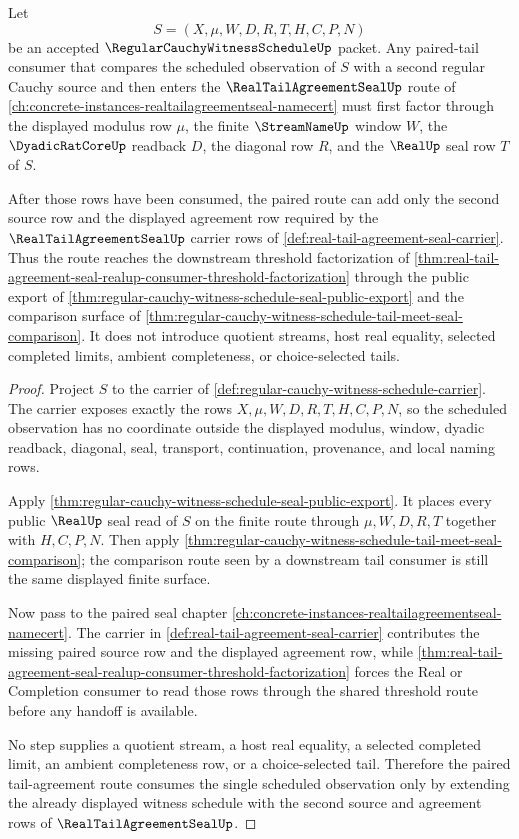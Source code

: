 \begin{theorem}
\label{thm:regular-cauchy-witness-schedule-tail-agreement-consumer}
Let
$$
S=(X,\mu,W,D,R,T,H,C,P,N)
$$
be an accepted $\RegularCauchyWitnessScheduleUp$ packet. Any paired-tail consumer that compares the scheduled observation of $S$ with a second regular Cauchy source and then enters the $\RealTailAgreementSealUp$ route of \autoref{ch:concrete-instances-realtailagreementseal-namecert} must first factor through the displayed modulus row $\mu$, the finite $\StreamNameUp$ window $W$, the $\DyadicRatCoreUp$ readback $D$, the diagonal row $R$, and the $\RealUp$ seal row $T$ of $S$.

After those rows have been consumed, the paired route can add only the second source row and the displayed agreement row required by the $\RealTailAgreementSealUp$ carrier rows of \autoref{def:real-tail-agreement-seal-carrier}. Thus the route reaches the downstream threshold factorization of \autoref{thm:real-tail-agreement-seal-realup-consumer-threshold-factorization} through the public export of \autoref{thm:regular-cauchy-witness-schedule-seal-public-export} and the comparison surface of \autoref{thm:regular-cauchy-witness-schedule-tail-meet-seal-comparison}. It does not introduce quotient streams, host real equality, selected completed limits, ambient completeness, or choice-selected tails.
\end{theorem}
\begin{proof}
Project $S$ to the carrier of \autoref{def:regular-cauchy-witness-schedule-carrier}. The carrier exposes exactly the rows $X,\mu,W,D,R,T,H,C,P,N$, so the scheduled observation has no coordinate outside the displayed modulus, window, dyadic readback, diagonal, seal, transport, continuation, provenance, and local naming rows.

Apply \autoref{thm:regular-cauchy-witness-schedule-seal-public-export}. It places every public $\RealUp$ seal read of $S$ on the finite route through $\mu,W,D,R,T$ together with $H,C,P,N$. Then apply \autoref{thm:regular-cauchy-witness-schedule-tail-meet-seal-comparison}; the comparison route seen by a downstream tail consumer is still the same displayed finite surface.

Now pass to the paired seal chapter \autoref{ch:concrete-instances-realtailagreementseal-namecert}. The carrier in \autoref{def:real-tail-agreement-seal-carrier} contributes the missing paired source row and the displayed agreement row, while \autoref{thm:real-tail-agreement-seal-realup-consumer-threshold-factorization} forces the Real or Completion consumer to read those rows through the shared threshold route before any handoff is available.

No step supplies a quotient stream, a host real equality, a selected completed limit, an ambient completeness row, or a choice-selected tail. Therefore the paired tail-agreement route consumes the single scheduled observation only by extending the already displayed witness schedule with the second source and agreement rows of $\RealTailAgreementSealUp$.
\end{proof}

